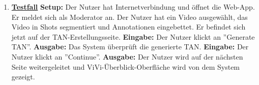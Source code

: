 \begin{enumerate}
	\item \underline{\textbf{Testfall}} \linebreak
	\textbf{Setup:} Der Nutzer hat Internetverbindung und öffnet die Web-App. Er meldet sich als Moderator an. Der Nutzer hat ein Video ausgewählt, das Video in Shots segmentiert und Annotationen eingebettet. Er befindet sich jetzt auf der TAN-Erstellungsseite.\linebreak
	\textbf{Eingabe:} Der Nutzer klickt an ''Generate TAN''.\linebreak
	\textbf{Ausgabe:} Das System überprüft die generierte TAN.\linebreak
	\textbf{Eingabe:} Der Nutzer klickt an ''Continue''.\linebreak
	\textbf{Ausgabe:} Der Nutzer wird auf der nächsten Seite weitergeleitet und ViVi-Überblick-Oberfläche wird von dem System gezeigt.
	
\end{enumerate}
